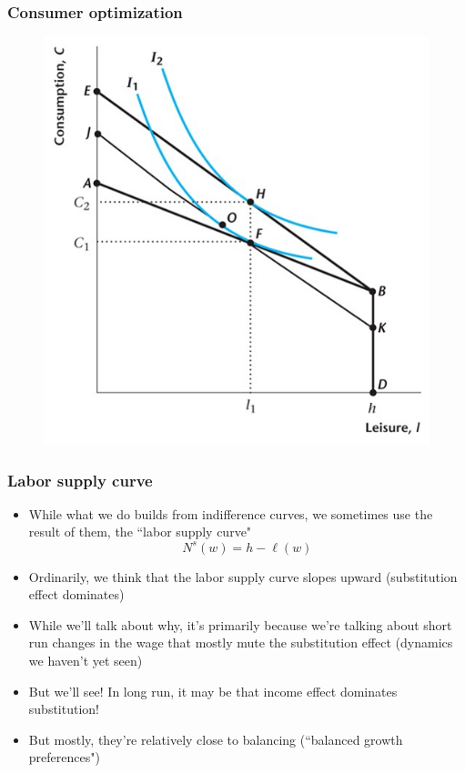 \documentclass{beamer}
\begin{document}
\begin{frame}
\frametitle[alignment=center]{Consumer optimization}
\begin{figure}
\centering
\includegraphics[scale=0.5]{Figures/W_Fig_4pt8.png}
\end{figure}
\end{frame}

\begin{frame}
\frametitle[alignment=center]{Labor supply curve}
\begin{itemize}
\item While what we do builds from indifference curves, we sometimes use the result of them, the ``labor supply curve"
$$N^s(w)=h-\ell(w)$$
\item Ordinarily, we think that the labor supply curve slopes upward (substitution effect dominates)
\bigskip
\item While we'll talk about why, it's primarily because we're talking about short run changes in the wage that mostly mute the substitution effect (dynamics we haven't yet seen)
\bigskip
\item But we'll see!  In long run, it may be that income effect dominates substitution!
\bigskip
\item But mostly, they're relatively close to balancing (``balanced growth preferences")
\end{itemize}
\end{frame}
\end{document}
